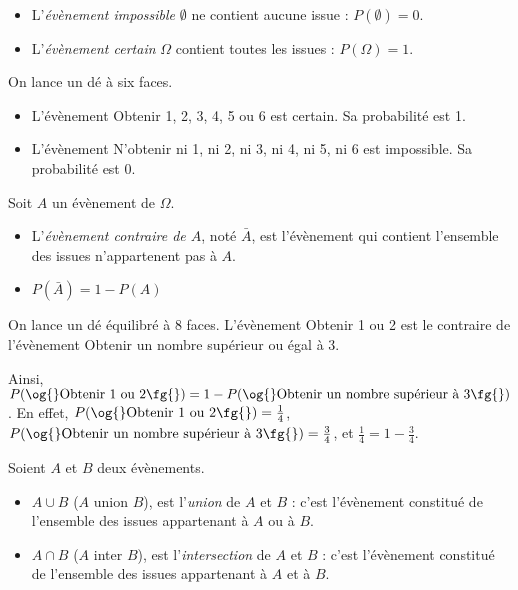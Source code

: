 \begin{defprop}~
  \begin{itemize}
    \item L'\emph{évènement impossible} $\emptyset$ ne contient aucune issue : $P(\emptyset)=0$.
    \item L'\emph{évènement certain} $\Omega$ contient toutes les issues : $P(\Omega)=1$.
  \end{itemize}
\end{defprop}

\begin{exemple}On lance un dé à six faces.
  \begin{itemize}
    \item L'évènement \og{}Obtenir 1, 2, 3, 4, 5 ou 6\fg{} est certain. Sa probabilité est 1.
    \item L'évènement \og{}N'obtenir ni 1, ni 2, ni 3, ni 4, ni 5, ni 6\fg{} est impossible. Sa probabilité est 0.
  \end{itemize}
\end{exemple}

\begin{defprop}Soit $A$ un évènement de $\Omega$.
  \begin{itemize}
    \item L'\emph{évènement contraire de $A$}, noté $\bar A$, est l'évènement qui contient l'ensemble des issues n'appartenent pas à $A$.
    \item $P(\bar A)=1-P(A)$
  \end{itemize}
\end{defprop}

\begin{exemple}On lance un dé équilibré à 8 faces. L'évènement \og{}Obtenir 1 ou
  2\fg{} est le contraire de l'évènement \og{}Obtenir un nombre supérieur ou égal à
  3\fg{}.

  Ainsi, $P(\text{\og{}Obtenir 1 ou 2\fg{}}) = 1 - P(\text{\og{}Obtenir un nombre supérieur à 3\fg{}})$. En effet,
  $P(\text{\og{}Obtenir 1 ou 2\fg{}})=\frac{1}{4}$, $P(\text{\og{}Obtenir un nombre
  supérieur à 3\fg{}})=\frac{3}{4}$, et $\frac{1}{4}=1-\frac{3}{4}$.
\end{exemple}

\begin{definition}Soient $A$ et $B$ deux évènements.
  \begin{itemize}
    \item $A \cup B$ (\og{}$A$ union $B$\fg{}), est l'\emph{union} de $A$ et $B$ : c'est l'évènement constitué de l'ensemble des issues appartenant à $A$ ou à $B$.
    \item $A \cap B$ (\og{}$A$ inter $B$\fg{}), est l'\emph{intersection} de $A$ et $B$ : c'est l'évènement constitué de l'ensemble des issues appartenant à $A$ et à $B$.
  \end{itemize}
\end{definition}

